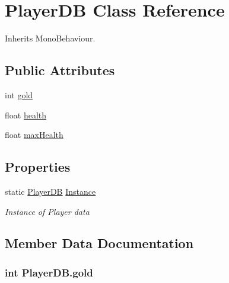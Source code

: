 \hypertarget{class_player_d_b}{}\section{Player\+DB Class Reference}
\label{class_player_d_b}


Inherits Mono\+Behaviour.

\subsection*{Public Attributes}
\begin{DoxyCompactItemize}
\item 
int \hyperlink{class_player_d_b_aba17755a7f414560143353b75e123514}{gold}
\item 
float \hyperlink{class_player_d_b_a349dde17e68f7c93fd689643514ef1a7}{health}
\item 
float \hyperlink{class_player_d_b_a41578d9c4e3730f7f3cc7481c9b11bda}{max\+Health}
\end{DoxyCompactItemize}
\subsection*{Properties}
\begin{DoxyCompactItemize}
\item 
static \hyperlink{class_player_d_b}{Player\+DB} \hyperlink{class_player_d_b_a3cd572351792685b7fb3761b7f233b15}{Instance}
\begin{DoxyCompactList}\small\item\em Instance of Player data \end{DoxyCompactList}\end{DoxyCompactItemize}


\subsection{Member Data Documentation}
\subsubsection[{\texorpdfstring{gold}{gold}}]{\setlength{\rightskip}{0pt plus 5cm}int Player\+D\+B.\+gold}\hypertarget{class_player_d_b_aba17755a7f414560143353b75e123514}{}\label{class_player_d_b_aba17755a7f414560143353b75e123514}
